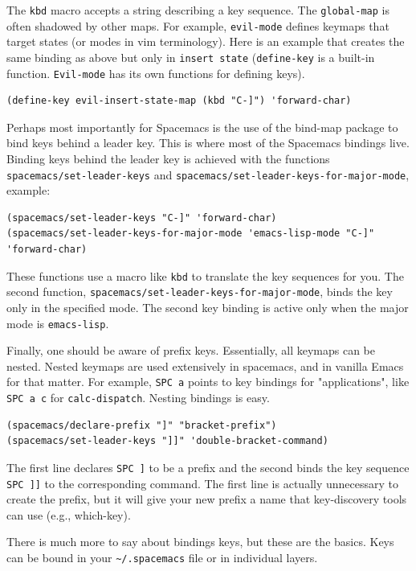 \documentclass[11pt]{article}
\begin{document}
The \texttt{kbd} macro accepts a string describing a key sequence. The \texttt{global-map} is
often shadowed by other maps. For example, \texttt{evil-mode} defines keymaps that
target states (or modes in vim terminology). Here is an example that creates the
same binding as above but only in \texttt{insert state} (\texttt{define-key} is a built-in
function. \texttt{Evil-mode} has its own functions for defining keys).

\begin{verbatim}
(define-key evil-insert-state-map (kbd "C-]") 'forward-char)
\end{verbatim}

Perhaps most importantly for Spacemacs is the use of the bind-map package to
bind keys behind a leader key.
This is where most of the Spacemacs bindings live. Binding keys behind the
leader key is achieved with the functions \texttt{spacemacs/set-leader-keys} and
\texttt{spacemacs/set-leader-keys-for-major-mode}, example:

\begin{verbatim}
(spacemacs/set-leader-keys "C-]" 'forward-char)
(spacemacs/set-leader-keys-for-major-mode 'emacs-lisp-mode "C-]" 'forward-char)
\end{verbatim}

These functions use a macro like \texttt{kbd} to translate the key sequences for you.
The second function, \texttt{spacemacs/set-leader-keys-for-major-mode}, binds the key
only in the specified mode. The second key binding is active only when the
major mode is \texttt{emacs-lisp}.

Finally, one should be aware of prefix keys. Essentially, all keymaps can be
nested. Nested keymaps are used extensively in spacemacs, and in vanilla Emacs
for that matter. For example, \texttt{SPC a} points to key bindings for "applications",
like \texttt{SPC a c} for \texttt{calc-dispatch}. Nesting bindings is easy.

\begin{verbatim}
(spacemacs/declare-prefix "]" "bracket-prefix")
(spacemacs/set-leader-keys "]]" 'double-bracket-command)
\end{verbatim}

The first line declares \texttt{SPC ]} to be a prefix and the second binds the key
sequence \texttt{SPC ]]} to the corresponding command. The first line is actually
unnecessary to create the prefix, but it will give your new prefix a name that
key-discovery tools can use (e.g., which-key).

There is much more to say about bindings keys, but these are the basics. Keys
can be bound in your \texttt{\textasciitilde{}/.spacemacs} file or in individual layers.
\end{document}
